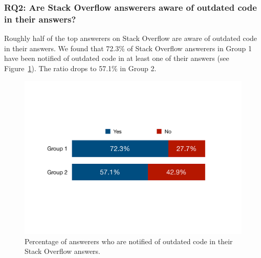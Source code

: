 \documentclass{svjour3}                     %
\begin{document}
\subsubsection*{RQ2: Are Stack Overflow answerers aware of outdated code in their answers?}

Roughly half of the top answerers on Stack Overflow
are aware of outdated code in their answers. We found that 72.3\% of Stack Overflow answerers in Group 1 have been notified of
outdated code in at least one of their answers (see Figure~\ref{fig:survey_outdated}). The ratio drops to 57.1\% in
Group 2. 

\begin{figure}
	\centering
	\includegraphics[width=.5\linewidth]{survey_outdated}
	\caption{Percentage of answerers who are notified of outdated code in their Stack Overflow answers.}
	\label{fig:survey_outdated}
\end{figure}
\end{document}
